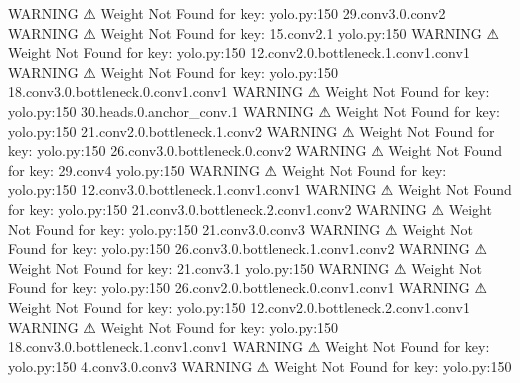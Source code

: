                     WARNING  ⚠ Weight Not Found for key:               yolo.py:150
                             29.conv3.0.conv2                                     
                    WARNING  ⚠ Weight Not Found for key: 15.conv2.1    yolo.py:150
                    WARNING  ⚠ Weight Not Found for key:               yolo.py:150
                             12.conv2.0.bottleneck.1.conv1.conv1                  
                    WARNING  ⚠ Weight Not Found for key:               yolo.py:150
                             18.conv3.0.bottleneck.0.conv1.conv1                  
                    WARNING  ⚠ Weight Not Found for key:               yolo.py:150
                             30.heads.0.anchor_conv.1                             
                    WARNING  ⚠ Weight Not Found for key:               yolo.py:150
                             21.conv2.0.bottleneck.1.conv2                        
                    WARNING  ⚠ Weight Not Found for key:               yolo.py:150
                             26.conv3.0.bottleneck.0.conv2                        
                    WARNING  ⚠ Weight Not Found for key: 29.conv4      yolo.py:150
                    WARNING  ⚠ Weight Not Found for key:               yolo.py:150
                             12.conv3.0.bottleneck.1.conv1.conv1                  
                    WARNING  ⚠ Weight Not Found for key:               yolo.py:150
                             21.conv3.0.bottleneck.2.conv1.conv2                  
                    WARNING  ⚠ Weight Not Found for key:               yolo.py:150
                             21.conv3.0.conv3                                     
                    WARNING  ⚠ Weight Not Found for key:               yolo.py:150
                             26.conv3.0.bottleneck.1.conv1.conv2                  
                    WARNING  ⚠ Weight Not Found for key: 21.conv3.1    yolo.py:150
                    WARNING  ⚠ Weight Not Found for key:               yolo.py:150
                             26.conv2.0.bottleneck.0.conv1.conv1                  
                    WARNING  ⚠ Weight Not Found for key:               yolo.py:150
                             12.conv2.0.bottleneck.2.conv1.conv1                  
                    WARNING  ⚠ Weight Not Found for key:               yolo.py:150
                             18.conv3.0.bottleneck.1.conv1.conv1                  
                    WARNING  ⚠ Weight Not Found for key:               yolo.py:150
                             4.conv3.0.conv3                                      
                    WARNING  ⚠ Weight Not Found for key:               yolo.py:150
